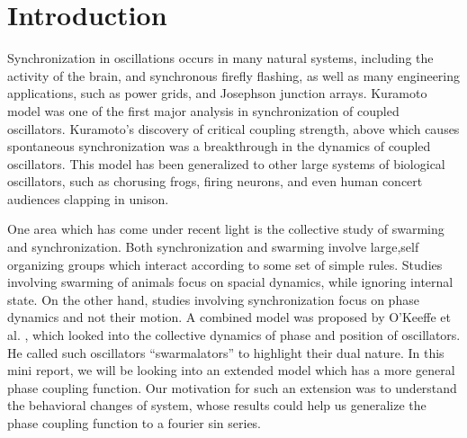 \documentclass[superscriptaddress,reprint,amssymb, amsmath,aps, pre]{revtex4-1}
\begin{document}
\section{Introduction}
{
    Synchronization in oscillations occurs in many natural systems, including the activity of the brain\cite{Sheeba2008}, and synchronous firefly flashing\cite{Mirollo1990Synchronization}, as well as many engineering applications, such as power grids\cite{powerGrid}, and Josephson junction arrays\cite{Watanabe1994}. Kuramoto model \cite{kuramoto} was one of the first major analysis in synchronization of coupled oscillators. Kuramoto's discovery of critical coupling strength, above which causes spontaneous synchronization was a breakthrough in the dynamics of coupled oscillators. This model has been generalized to other large systems of biological oscillators, such as chorusing frogs\cite{Aihara2008}, firing neurons\cite{SpikingNeurons}, and even human concert audiences clapping in unison\cite{Clapping}. 

    One area which has come under recent light is the collective study of swarming and synchronization. Both synchronization and swarming involve large,self organizing groups which interact according to some set of simple rules. Studies involving swarming of animals focus on spacial dynamics, while ignoring internal state. On the other hand, studies involving synchronization focus on phase dynamics and not their motion. A combined model was proposed by O’Keeffe et al. \cite{swarm}, which looked into the collective dynamics of phase and position of oscillators. He called such oscillators ``swarmalators'' to highlight their dual nature. In this mini report, we will be looking into an extended model which has a more general phase coupling function. Our motivation for such an extension was to understand the behavioral changes of system, whose results could help us generalize the phase coupling function to a fourier sin series. 
}

\noindent
\end{document}
